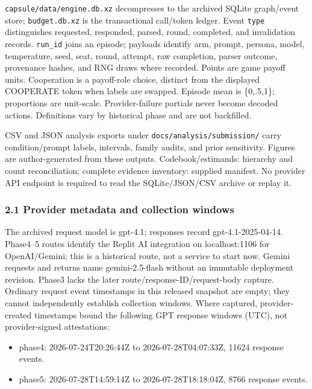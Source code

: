 \documentclass[11pt]{article}
\begin{document}
\texttt{capsule/data/engine.db.xz} decompresses to the archived SQLite
graph/event store; \texttt{budget.db.xz} is the transactional call/token
ledger. Event \texttt{type} distinguishes requested, responded, parsed,
round, completed, and invalidation records. \texttt{run\_id} joins an
episode; payloads identify arm, prompt, persona, model, temperature,
seed, seat, round, attempt, raw completion, parser outcome, provenance
hashes, and RNG draws where recorded. Points are game payoff units.
Cooperation is a payoff-role choice, distinct from the displayed
COOPERATE token when labels are swapped. Episode mean is \{0,.5,1\};
proportions are unit-scale. Provider-failure partials never become
decoded actions. Definitions vary by historical phase and are not
backfilled.

CSV and JSON analysis exports under \texttt{docs/analysis/submission/}
carry condition/prompt labels, intervals, family audits, and prior
sensitivity. Figures are author-generated from these outputs.
Codebook/estimands: hierarchy and count reconciliation; complete
evidence inventory: supplied manifest. No provider API endpoint is
required to read the SQLite/JSON/CSV archive or replay it.

\subsubsection{2.1 Provider metadata and collection
windows}\label{provider-metadata-and-collection-windows}

The archived request model is gpt-4.1; responses record
gpt-4.1-2025-04-14. Phase4--5 routes identify the Replit AI integration
on localhost:1106 for OpenAI/Gemini; this is a historical route, not a
service to start now. Gemini requests and returns name gemini-2.5-flash
without an immutable deployment revision. Phase3 lacks the later
route/response-ID/request-body capture. Ordinary request event
timestamps in this released snapshot are empty; they cannot
independently establish collection windows. Where captured,
provider-created timestamps bound the following GPT response windows
(UTC), not provider-signed attestations:

\begin{itemize}
\item
  phase4: 2026-07-24T20:26:44Z to 2026-07-28T04:07:33Z, 11624 response
  events.
\item
  phase5: 2026-07-28T14:59:14Z to 2026-07-28T18:18:04Z, 8766 response
  events.
\end{itemize}
\end{document}
